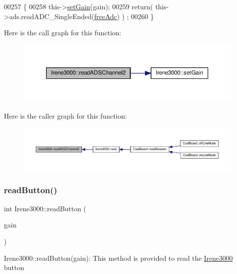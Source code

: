 \begin{DoxyCode}
00257 \{   
00258     this->\hyperlink{class_irene3000_aff7c5da186b388e7272e63ff88a20c34}{setGain}(gain);
00259     \textcolor{keywordflow}{return}( this->ads.readADC\_SingleEnded(\hyperlink{_irene3000_8h_a55497513af255250e464ed76543d46d7}{freeAdc}) ) ;
00260 \}
\end{DoxyCode}
Here is the call graph for this function\+:
\nopagebreak
\begin{figure}[H]
\begin{center}
\leavevmode
\includegraphics[width=350pt]{class_irene3000_ae73bd2ed14a199a7e83f4d6458476a7c_cgraph}
\end{center}
\end{figure}
Here is the caller graph for this function\+:
\nopagebreak
\begin{figure}[H]
\begin{center}
\leavevmode
\includegraphics[width=350pt]{class_irene3000_ae73bd2ed14a199a7e83f4d6458476a7c_icgraph}
\end{center}
\end{figure}
\mbox{\label{class_irene3000_ae0e0a5b773c3625b44c1d113c76a1540}} 
\subsubsection{\texorpdfstring{read\+Button()}{readButton()}}
{\footnotesize\ttfamily int Irene3000\+::read\+Button (\begin{DoxyParamCaption}\item[{ads\+Gain\+\_\+t}]{gain }\end{DoxyParamCaption})}

Irene3000\+::read\+Button(gain)\+: This method is provided to read the \hyperlink{class_irene3000}{Irene3000} button

